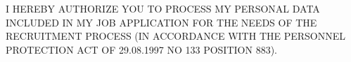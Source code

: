 \documentclass[11pt, a4paper]{awesome-cv}
\begin{document}
\makecvheader[L]

\makecvfooter
  {
I HEREBY AUTHORIZE YOU TO PROCESS MY PERSONAL DATA INCLUDED IN MY JOB APPLICATION FOR THE NEEDS OF THE RECRUITMENT PROCESS (IN ACCORDANCE WITH THE PERSONNEL PROTECTION ACT OF 29.08.1997 NO 133 POSITION 883).}
  {}
  {}


% 
\vspace{-2.0mm}


%


%




\end{document}
